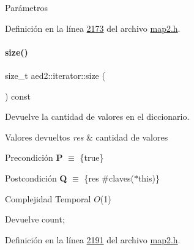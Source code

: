 \begin{DoxyParams}{\-Parámetros}
\begin{DoxyCompactItemize}
Definición en la línea \hyperlink{map2_8h_source_l02173}{2173} del archivo \hyperlink{map2_8h_source}{map2.\+h}.

\mbox{\label{classaed2_1_1iterator_aa07bd4de2aeca4a6936fdbe9013be2ee_aa07bd4de2aeca4a6936fdbe9013be2ee}} 
\paragraph{\texorpdfstring{size()}{size()}}
{\footnotesize\ttfamily size\+\_\+t aed2\+::iterator\+::size (\begin{DoxyParamCaption}{ }\end{DoxyParamCaption}) const\hspace{0.3cm}{\ttfamily [inline]}}



Devuelve la cantidad de valores en el diccionario. 


\begin{DoxyRetVals}{Valores devueltos}
{\em res} & cantidad de valores\\
\hline
\end{DoxyRetVals}
\begin{DoxyPrecond}{Precondición}
{\bfseries P} $\equiv$ \{true\} 
\end{DoxyPrecond}
\begin{DoxyPostcond}{Postcondición}
{\bfseries Q} $\equiv$ \{res  \#claves($\ast$this)\}
\end{DoxyPostcond}

\begin{DoxyDescription}
\item[Complejidad Temporal]$O$(1)
\end{DoxyDescription}Devuelve count; 

Definición en la línea \hyperlink{map2_8h_source_l02191}{2191} del archivo \hyperlink{map2_8h_source}{map2.\+h}.

\mbox{\label{classaed2_1_1iterator_ab9446668ad5619115b6c4a10eac83d68_ab9446668ad5619115b6c4a10eac83d68}} 

\end{DoxyCompactItemize}
\end{DoxyParams}
